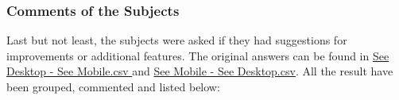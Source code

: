 \begin{table}[htb]
  \caption{Correlation between the Android version or device and the dependent variables calculated with the \gls{tau}.}
  \label{table:android-tau}
  \end{table}

\subsubsection{Comments of the Subjects}
Last but not least, the subjects were asked if they had suggestions for improvements or additional features.
The original answers can be found in \hyperref[group1]{See Desktop - See Mobile.csv } and \hyperref[group2]{See Mobile - See Desktop.csv}.
All the result have been grouped, commented and listed below: 


